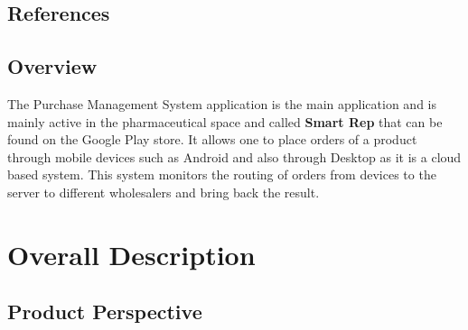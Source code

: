 \documentclass[a4paper,10pt]{article}
\begin{document}
	\subsection{References} 
	
	\subsection{Overview} 
	The Purchase Management System application is the main application and is mainly active in the pharmaceutical space and called \textbf{Smart Rep} that can be found on the Google Play store. It allows one to place orders of a product through mobile devices such as Android and also through Desktop as it is a cloud based system. This system monitors the routing of orders from devices to the server to different wholesalers and bring back the result.

	\newpage

\section{Overall Description}

\subsection{Product Perspective}
\end{document}
